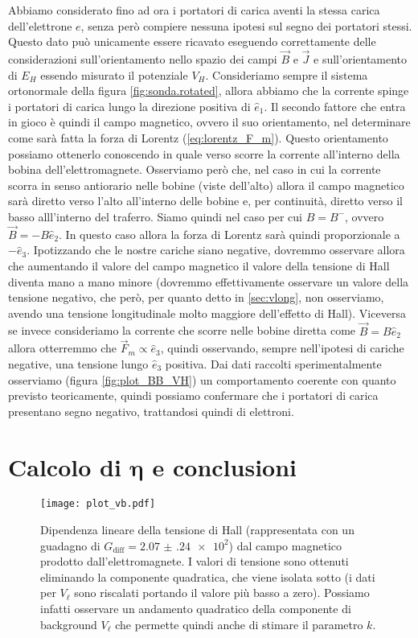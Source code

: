 \documentclass[
    prl,
    reprint, 
    superscriptaddress, 
    altaffilletter, 
    amsmath, 
    amssymb, 
    a4paper,
    varvw]{revtex4-2}
\begin{document}
Abbiamo considerato fino ad ora i portatori di carica aventi la stessa carica dell'elettrone $e$, senza però compiere nessuna ipotesi sul segno dei portatori stessi. Questo dato può unicamente essere ricavato eseguendo correttamente delle considerazioni sull'orientamento nello spazio dei campi $\vec{B}$ e $\vec{J}$ e sull'orientamento di $E_H$ essendo misurato il potenziale $V_H$. Consideriamo sempre il sistema ortonormale della figura \ref{fig:sonda.rotated}, allora abbiamo che la corrente spinge i portatori di carica lungo la direzione positiva di $\hat{e}_1$. Il secondo fattore che entra in gioco è quindi il campo magnetico, ovvero il suo orientamento, nel determinare come sarà fatta la forza di Lorentz (\ref{eq:lorentz_F_m}). Questo orientamento possiamo ottenerlo conoscendo in quale verso scorre la corrente all'interno della bobina dell'elettromagnete. Osserviamo però che, nel caso in cui la corrente scorra in senso antiorario nelle bobine (viste dell'alto) allora il campo magnetico sarà diretto verso l'alto all'interno delle bobine e, per continuità, diretto verso il basso alll'interno del traferro. Siamo quindi nel caso per cui $B=B^-$, ovvero $\vec{B} = -B\hat{e}_2$. In questo caso allora la forza di Lorentz sarà quindi proporzionale a $-\hat{e}_3$. Ipotizzando che le nostre cariche siano negative, dovremmo osservare allora che aumentando il valore del campo magnetico il valore della tensione di Hall diventa mano a mano minore (dovremmo effettivamente osservare un valore della tensione negativo, che però, per quanto detto in \ref{sec:vlong}, non osserviamo, avendo una tensione longitudinale molto maggiore dell'effetto di Hall). Viceversa se invece consideriamo la corrente che scorre nelle bobine diretta come $\vec{B}=B\hat{e}_2$ allora otterremmo che $\vec{F}_m \propto \hat{e}_3$, quindi osservando, sempre nell'ipotesi di cariche negative, una tensione lungo $\hat{e}_3$ positiva. Dai dati raccolti sperimentalmente osserviamo (figura \ref{fig:plot_BB_VH}) un comportamento coerente con quanto previsto teoricamente, quindi possiamo confermare che i portatori di carica presentano segno negativo, trattandosi quindi di elettroni. 

\section{Calcolo di $\mathbf\eta$ e conclusioni}\label{sec:computing_eta_and_conlusion}

\begin{figure}
    \centering
    \texttt{[image: plot\_vb.pdf]}
    \caption{Dipendenza lineare della tensione di Hall (rappresentata con un guadagno di $G_\text{diff} = \num{2.07(24)e2}$) dal campo magnetico prodotto dall'elettromagnete. I valori di tensione sono ottenuti eliminando la componente quadratica, che viene isolata sotto (i dati per $V_\ell$ sono riscalati portando il valore più basso a zero). Possiamo infatti osservare un andamento quadratico della componente di background $V_\ell$ che permette quindi anche di stimare il parametro $k$.}\label{fig:plot_vb}
\end{figure}
\end{document}
